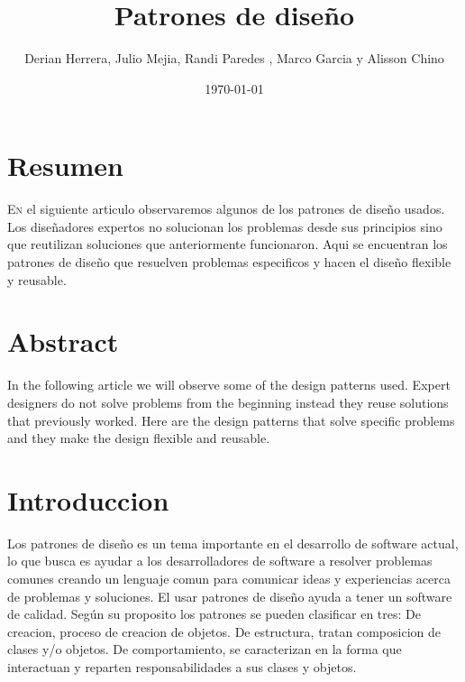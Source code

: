 \documentclass[twoside,twocolumn]{article}
\title{Patrones de diseño} %
\author{Derian Herrera, Julio Mejia, Randi Paredes , Marco Garcia y Alisson Chino}
\date{\today} %
\begin{document}
\maketitle


\section{Resumen}

\lettrine[nindent=0em,lines=3]{E}n el siguiente articulo observaremos algunos
de los patrones de diseño usados.
Los diseñadores  expertos no solucionan los problemas desde  sus principios
sino que reutilizan soluciones  que anteriormente funcionaron.
Aqui se encuentran los patrones de diseño que resuelven problemas especificos 
y hacen el diseño flexible  y reusable.




\section{Abstract}


In the following article we will observe some
of the design patterns used.
Expert designers do not solve problems from the beginning
instead they reuse solutions that previously worked.
Here are the design patterns that solve specific problems
and they make the design flexible and reusable.





\section{Introduccion}
Los patrones de diseño es un tema  importante  en el desarrollo  de software 
actual, lo que busca es ayudar  a los desarrolladores de software a resolver  problemas comunes
creando un lenguaje comun  para comunicar ideas  y experiencias acerca de problemas 
y soluciones.
El usar patrones de diseño ayuda a tener un software de calidad.
Según su proposito  los patrones se pueden clasificar en tres:
De creacion, proceso de creacion de objetos.
De estructura, tratan composicion de clases y/o objetos.
De comportamiento, se caracterizan en la forma que interactuan y reparten responsabilidades
 a sus clases y objetos.
\end{document}
